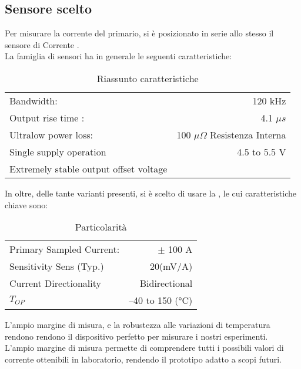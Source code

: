 \subsection{Sensore scelto}
Per misurare la corrente del primario, si è posizionato in serie allo stesso il sensore di Corrente \cite{ACS770}.\\
La famiglia di sensori ha in generale le seguenti caratteristiche:
\begin{table}[H]
	\caption[\cite{ACS770}  Riassunto caratteristiche]{Riassunto caratteristiche}
	\centering
	\begin{tabular}[t]{|l r|}
		\hline
		Bandwidth:                             & 120 kHz                               \\
		Output rise time :                     & 4.1 $ \mu s $                         \\
		Ultralow power loss:                   & 100 $ \mu \Omega $ Resistenza Interna \\
		Single supply operation                & 4.5 to 5.5 V                          \\
		Extremely stable output offset voltage &                                       \\
		\hline
	\end{tabular}
	
\end{table}

\noindent
In oltre, delle tante varianti presenti, si è scelto di usare la , le cui caratteristiche chiave sono:

\begin{table}[H]
	\centering
	\caption[ Particolarità]{ Particolarità}
	\begin{tabular}[t]{|l r|}
		\hline
		Primary Sampled Current: & $\pm$ 100 A     \\
		Sensitivity Sens (Typ.)  & 20(mV/A)        \\
		Current Directionality   & Bidirectional   \\
		$T_{OP}$                 & –40 to 150 (°C) \\
		\hline
	\end{tabular}
	
\end{table}

\noindent
L'ampio margine di misura, e la robustezza alle variazioni di temperatura rendono rendono il dispositivo perfetto per misurare i nostri esperimenti.\\
L'ampio margine di misura permette di comprendere tutti i possibili valori di corrente ottenibili in laboratorio, rendendo il prototipo adatto a scopi futuri.
